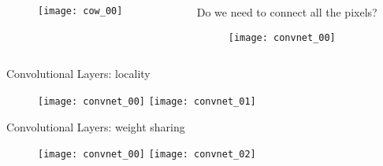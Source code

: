 \begin{frame}

  \begin{columns}
    \begin{column}{0.48\textwidth}
      \begin{figure}
        \texttt{[image: cow\_00]}
      \end{figure}
    \end{column}
    \begin{column}{0.48\textwidth}
      Do we need to connect all the pixels?
      \begin{figure}
        \texttt{[image: convnet\_00]}
      \end{figure}

    \end{column}
  \end{columns}

\end{frame}


\begin{frame}{Convolutional Layers: locality}
  \begin{figure}
    \texttt{[image: convnet\_00]}
    \texttt{[image: convnet\_01]}
  \end{figure}

\end{frame}


\begin{frame}{Convolutional Layers: weight sharing}
  \begin{figure}
    \texttt{[image: convnet\_00]}
    \texttt{[image: convnet\_02]}
  \end{figure}
\end{frame}


